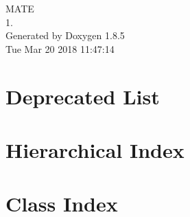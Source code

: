 \documentclass[twoside]{book}
\newcommand{\clearemptydoublepage}{%
  \newpage{\pagestyle{empty}\cleardoublepage}%
}
\begin{document}
\hypersetup{pageanchor=false}
\begin{titlepage}
\vspace*{7cm}
\begin{center}%
{\Large M\-A\-T\-E \\[1ex]\large 1. }\\
\vspace*{1cm}
{\large Generated by Doxygen 1.8.5}\\
\vspace*{0.5cm}
{\small Tue Mar 20 2018 11:47:14}\\
\end{center}
\end{titlepage}
\clearemptydoublepage
\tableofcontents
\clearemptydoublepage
{}
\hypersetup{pageanchor=true}

\chapter{Deprecated List}
\label{deprecated}
\hypertarget{deprecated}{}

\chapter{Hierarchical Index}

\chapter{Class Index}

\end{document}
